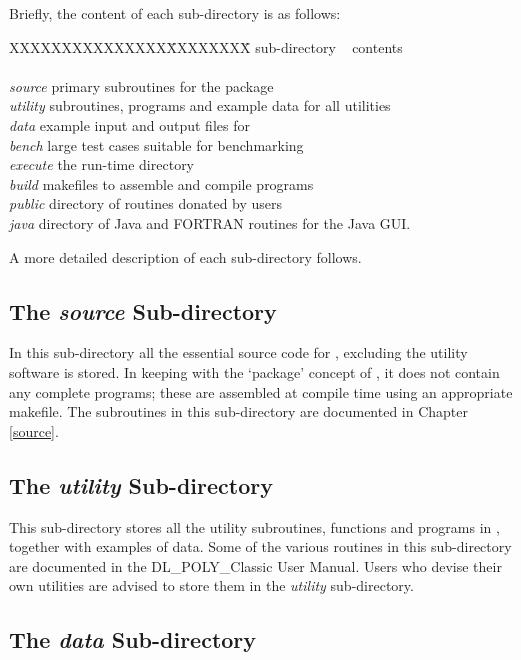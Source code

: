 Briefly, the content of each sub-directory is as follows:
\begin{tabbing}
XXXXXXXXXXXXXXX\= XXXXXXXX\= \kill
sub-directory\> ~ \> contents \\
\> ~ \> \\
{\em source} \> primary subroutines for the \D package \\
{\em utility} \> subroutines, programs and example data for all utilities \\
{\em data} \> example input and output files for \D \\
{\em bench} \> large test cases suitable for benchmarking \\
{\em execute} \> the \D run-time directory \\
{\em build} \> makefiles to assemble and compile \D programs \\
{\em public} \> directory of routines donated by \D users \\
{\em java} \> directory of Java and FORTRAN routines for the Java GUI. \\
\end{tabbing}

\noindent A more detailed description of each sub-directory
follows.

\subsection{The {\em source} Sub-directory}

In this sub-directory all the essential source code for \D,
excluding the utility software is stored.  In keeping with the
`package' concept of \D, it does not contain any complete
programs; these are assembled at compile time using an appropriate
makefile.  The subroutines in this sub-directory are documented in
Chapter \ref{source}.

\subsection{The {\em utility} Sub-directory}

This sub-directory stores all the utility subroutines, functions and
programs in \D, together with examples of data.  Some of the various
routines in this sub-directory are documented in the DL\_POLY\_Classic
User Manual.  Users who devise their own utilities are advised
to store them in the {\em utility} sub-directory.

\subsection{The {\em data} Sub-directory}

